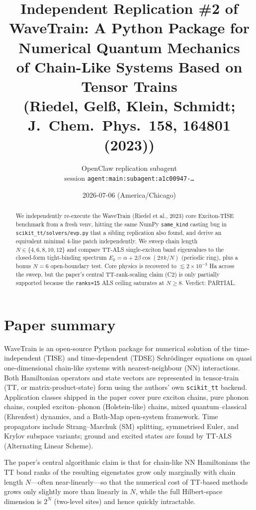 \documentclass[11pt]{article}
\title{Independent Replication \#2 of \\
       WaveTrain: A Python Package for Numerical Quantum Mechanics \\
       of Chain-Like Systems Based on Tensor Trains \\
       (Riedel, Gel\ss{}, Klein, Schmidt; J.\ Chem.\ Phys.\ 158, 164801 (2023))}
\author{OpenClaw replication subagent \\
        \small session \texttt{agent:main:subagent:a1c00947-\dots}}
\date{2026-07-06 (America/Chicago)}
\begin{document}
\maketitle

\begin{abstract}
We independently re-execute the WaveTrain (Riedel et al., 2023) core Exciton-TISE
benchmark from a fresh venv, hitting the same NumPy \texttt{same\_kind} casting
bug in \texttt{scikit\_tt/solvers/evp.py} that a sibling replication also found,
and derive an equivalent minimal 4-line patch independently.  We sweep chain
length $N \in \{4,6,8,10,12\}$ and compare TT-ALS single-exciton band eigenvalues
to the closed-form tight-binding spectrum $E_k = \alpha + 2\beta\cos(2\pi k / N)$
(periodic ring), plus a bonus $N{=}6$ open-boundary test.  Core physics is
recovered to $\lesssim 2\times 10^{-3}$ Ha across the sweep, but the paper's
central TT-rank-scaling claim (C2) is only partially supported because the
\texttt{ranks{=}15} ALS ceiling saturates at $N\ge 8$.  Verdict: PARTIAL.
\end{abstract}

\section{Paper summary}
WaveTrain \cite{Riedel2023} is an open-source Python package for numerical solution
of the time-independent (TISE) and time-dependent (TDSE) Schr\"odinger equations
on quasi one-dimensional chain-like systems with nearest-neighbour (NN)
interactions.  Both Hamiltonian operators and state vectors are represented in
tensor-train (TT, or matrix-product-state) form using the authors' own
\texttt{scikit\_tt} backend.  Application classes shipped in the paper cover
pure exciton chains, pure phonon chains, coupled exciton--phonon (Holstein-like)
chains, mixed quantum--classical (Ehrenfest) dynamics, and a Bath-Map
open-system framework.  Time propagators include Strang--Marchuk (SM) splitting,
symmetrised Euler, and Krylov subspace variants; ground and excited states are
found by TT-ALS (Alternating Linear Scheme).

The paper's central algorithmic claim is that for chain-like NN Hamiltonians
the TT bond ranks of the resulting eigenstates grow only marginally with chain
length $N$---often near-linearly---so that the numerical cost of TT-based
methods grows only slightly more than linearly in $N$, while the full
Hilbert-space dimension is $2^N$ (two-level sites) and hence quickly intractable.
\end{document}
